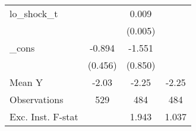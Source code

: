 {\begin{tabular}{l*{3}{c}}
\addlinespace
lo\_shock\_t  &                     &       0.009\sym{*}  &                     \\
            &                     &     (0.005)         &                     \\
\addlinespace
\_cons      &      -0.894\sym{*}  &      -1.551\sym{*}  &                     \\
            &     (0.456)         &     (0.850)         &                     \\
\midrule
Mean Y      &       -2.03         &       -2.25         &       -2.25         \\
Observations&         529         &         484         &         484         \\
Exc. Inst. F-stat&                     &       1.943         &       1.037         \\
\bottomrule
\end{tabular}
}
